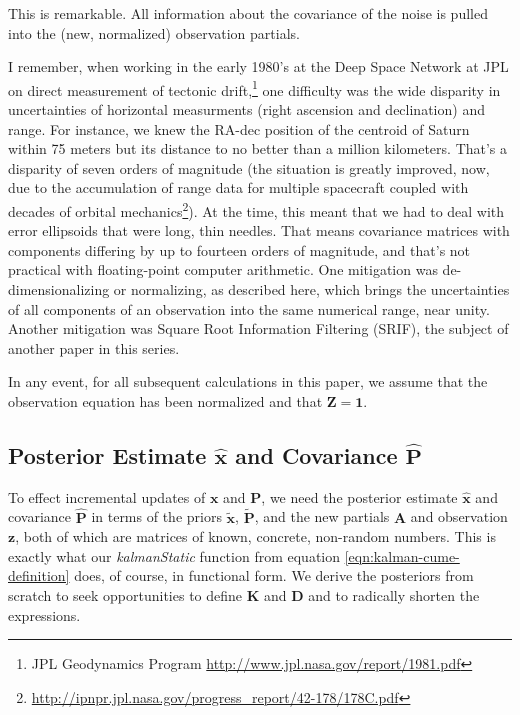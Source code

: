 \documentclass[10pt,oneside,x11names]{article}
\begin{document}
This is remarkable. All information about the covariance of the noise is pulled
into the (new, normalized) observation partials. 

I remember, when working in the early 1980's at the Deep Space Network at JPL
on direct measurement of tectonic
drift,\footnote{JPL Geodynamics Program \url{http://www.jpl.nasa.gov/report/1981.pdf}} one difficulty was the wide disparity in uncertainties of
horizontal measurments (right ascension and declination) and range. For
instance, we knew the RA-dec position of the centroid of Saturn within 75 meters
but its distance to no better than a million kilometers. That's a disparity of
seven orders of magnitude (the situation is greatly improved, now, due to the
accumulation of range data for multiple spacecraft coupled with decades of
orbital mechanics\footnote{\url{http://ipnpr.jpl.nasa.gov/progress_report/42-178/178C.pdf}}). At the time, this meant that we had to deal with
error ellipsoids that were long, thin needles. That means covariance matrices
with components differing by up to fourteen orders of magnitude, and that's not
practical with floating-point computer arithmetic.
One mitigation was
de-dimensionalizing or normalizing, as described here, which brings the
uncertainties of all
components of an observation into the same numerical range, near unity. Another
mitigation was Square Root Information Filtering (SRIF), the subject of another
paper in this series.

In any event, for all subsequent calculations in this paper, we assume that the
observation equation has been normalized and that \(\mathbold{Z}=\mathbold{1}\). 


\subsection{Posterior Estimate \(\hat{\mathbold{x}}\) and Covariance \(\hat{\mathbold{P}}\)}
\label{sec:orgheadline16}

To effect incremental updates of \(\mathbold{x}\) and \(\mathbold{P}\), we need the
posterior estimate \(\hat{\mathbold{x}}\) and covariance \(\hat{\mathbold{P}}\) in
terms of the priors \(\tilde{\mathbold{x}}\), \(\tilde{\mathbold{P}}\), and the new
partials \(\mathbold{A}\) and observation \(\mathbold{z}\), both of which are
matrices of known, concrete, non-random numbers. This is exactly what our
\emph{kalmanStatic} function from equation \ref{eqn:kalman-cume-definition} does, of course,
in functional form.  We derive the posteriors from scratch to seek
opportunities to define \(\mathbold{K}\) and \(\mathbold{D}\) and to radically shorten
the expressions. 
\end{document}
